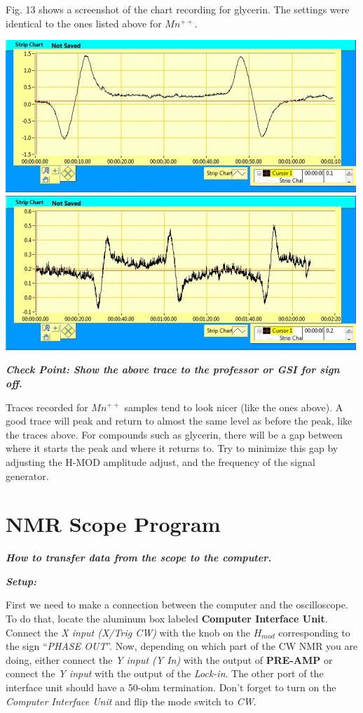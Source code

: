\documentclass{../lab}
\begin{document}
Fig. 13 shows a screenshot of the chart recording for glycerin. The settings were identical to the ones listed above for  $Mn^{++}$.

\noindent
\href{http://experimentationlab.berkeley.edu/sites/default/files/images/500px-0_33MMnchart.jpg}{\includegraphics[width=0.33\linewidth,keepaspectratio]{images/500px-0_33MMnchart.jpg}}
\href{http://experimentationlab.berkeley.edu/sites/default/files/images/500px-Glycerinchart.jpg}{\includegraphics[width=0.33\linewidth,keepaspectratio]{images/500px-Glycerinchart.jpg}}

\emph{\textbf{Check Point: Show the above trace to the professor or GSI for sign off.}}

Traces recorded for  $Mn^{++}$ samples tend to look nicer (like the ones above). A good trace will peak and return to almost the same level as before the peak, like the traces above. For compounds such as glycerin, there will be a gap between where it starts the peak and where it returns to. Try to minimize this gap by adjusting the H-MOD amplitude adjust, and the frequency of the signal generator.

\section{NMR Scope Program}

\emph{\textbf{How to transfer data from the scope to the computer.}}

\emph{\textbf{Setup:}}

First we need to make a connection between the computer and the oscilloscope. To do that, locate the aluminum box labeled \textbf{Computer Interface Unit}. Connect the \emph{X input (X/Trig CW)} with the knob on the $H_{mod}$ corresponding to the sign ``\emph{PHASE OUT}''. Now, depending on which part of the CW NMR you are doing, either connect the \emph{Y input (Y In)} with the output of \textbf{PRE-AMP} or connect the \emph{Y input} with the output of the \emph{Lock-in}. The other port of the interface unit should have a 50-ohm termination. Don't forget to turn on the \emph{Computer Interface Unit} and flip the mode switch to \emph{CW}.
\end{document}
